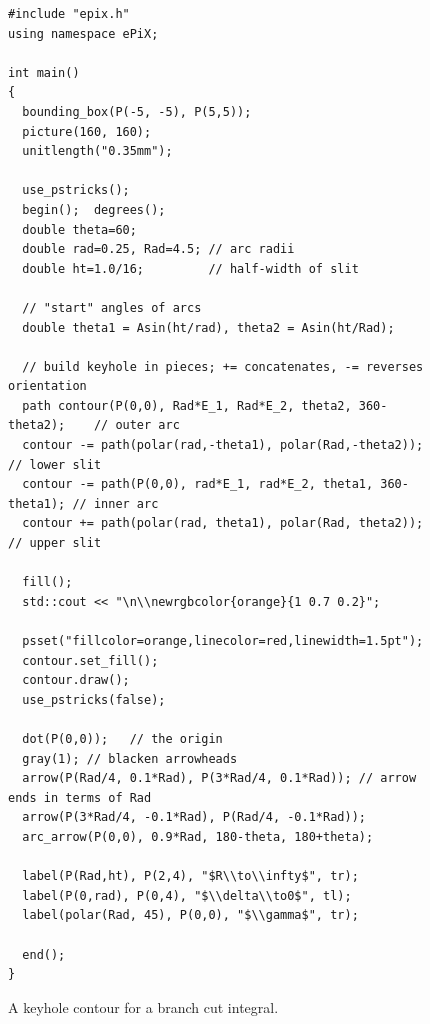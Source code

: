 \documentclass[11pt]{article}
\begin{document}
\begin{figure}[hbt]
\begin{center}

\vspace*{-2.25in}
\begin{footnotesize}
\begin{verbatim}
#include "epix.h"
using namespace ePiX;

int main() 
{
  bounding_box(P(-5, -5), P(5,5));
  picture(160, 160);
  unitlength("0.35mm");

  use_pstricks();
  begin();  degrees();
  double theta=60;
  double rad=0.25, Rad=4.5; // arc radii
  double ht=1.0/16;         // half-width of slit

  // "start" angles of arcs
  double theta1 = Asin(ht/rad), theta2 = Asin(ht/Rad);

  // build keyhole in pieces; += concatenates, -= reverses orientation
  path contour(P(0,0), Rad*E_1, Rad*E_2, theta2, 360-theta2);    // outer arc
  contour -= path(polar(rad,-theta1), polar(Rad,-theta2));       // lower slit
  contour -= path(P(0,0), rad*E_1, rad*E_2, theta1, 360-theta1); // inner arc
  contour += path(polar(rad, theta1), polar(Rad, theta2));       // upper slit

  fill();
  std::cout << "\n\\newrgbcolor{orange}{1 0.7 0.2}";

  psset("fillcolor=orange,linecolor=red,linewidth=1.5pt");
  contour.set_fill();
  contour.draw();
  use_pstricks(false);

  dot(P(0,0));   // the origin
  gray(1); // blacken arrowheads
  arrow(P(Rad/4, 0.1*Rad), P(3*Rad/4, 0.1*Rad)); // arrow ends in terms of Rad
  arrow(P(3*Rad/4, -0.1*Rad), P(Rad/4, -0.1*Rad));
  arc_arrow(P(0,0), 0.9*Rad, 180-theta, 180+theta);

  label(P(Rad,ht), P(2,4), "$R\\to\\infty$", tr);
  label(P(0,rad), P(0,4), "$\\delta\\to0$", tl);
  label(polar(Rad, 45), P(0,0), "$\\gamma$", tr);

  end();
}
\end{verbatim}
\end{footnotesize}
\caption{A keyhole contour for a branch cut integral.}
\label{fig:contour}
\end{center}
\end{figure}
\end{document}
